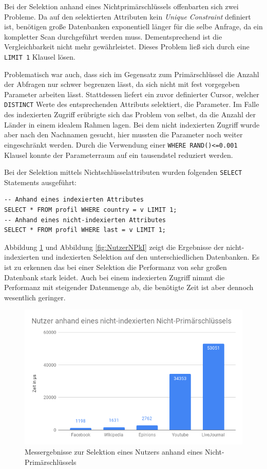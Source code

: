Bei der Selektion anhand eines Nichtprimärschlüssels offenbarten sich zwei Probleme. Da auf den selektierten Attributen kein \emph{Unique Constraint} definiert ist, benötigen große Datenbanken exponentiell länger für die selbe Anfrage, da ein kompletter Scan durchgeführt werden muss. Dementsprechend ist die Vergleichbarkeit nicht mehr gewährleistet. Dieses Problem ließ sich durch eine \lstinline{LIMIT 1} Klausel lösen.

Problematisch war auch, dass sich im Gegensatz zum Primärschlüssel die Anzahl der Abfragen nur schwer begrenzen lässt, da sich nicht mit fest vorgegeben Parameter arbeiten lässt. Stattdessen liefert ein zuvor definierter Cursor, welcher \lstinline{DISTINCT} Werte des entsprechenden Attributs selektiert, die Parameter. Im Falle des indexierten Zugriff erübrigte sich das Problem von selbst, da die Anzahl der Länder in einem idealem Rahmen lagen. Bei dem nicht indexierten Zugriff wurde aber nach den Nachnamen gesucht, hier mussten die Parameter noch weiter eingeschränkt werden. Durch die Verwendung einer \lstinline{WHERE RAND()<=0.001} Klausel konnte der Parameterraum auf ein tausendstel reduziert werden.

Bei der Selektion mittels Nichtschlüsselattributen wurden folgenden \lstinline{SELECT} Statements ausgeführt:
\begin{lstlisting}
-- Anhand eines indexierten Attributes
SELECT * FROM profil WHERE country = v LIMIT 1;
-- Anhand eines nicht-indexierten Attributes
SELECT * FROM profil WHERE last = v LIMIT 1;
\end{lstlisting}

Abbildung \ref{fig:NutzerNPk} und Abbildung \ref{fig:NutzerNPkI} zeigt die Ergebnisse der nicht-indexierten und indexierten Selektion auf den unterschiedlichen Datenbanken. Es ist zu erkennen das bei einer Selektion die Performanz von sehr großen Datenbank stark leidet. Auch bei einem indexierten Zugriff nimmt die Performanz mit steigender Datenmenge ab, die benötigte Zeit ist aber dennoch wesentlich geringer.
\begin{figure}[h]
	\centering
	\includegraphics[width=\textwidth]{images/NutzerNPk.png}
	\caption{Messergebnisse zur Selektion eines Nutzers anhand eines Nicht-Primärschlüssels}
	\label{fig:NutzerNPk}
\end{figure}


